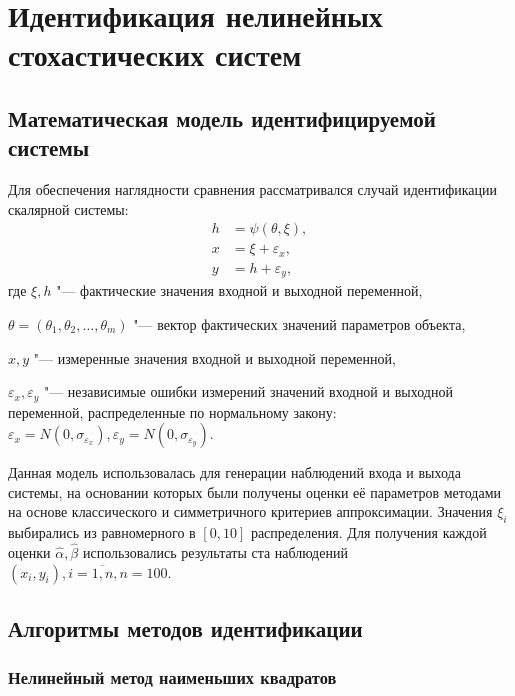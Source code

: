 \chapter[Идентификация нелинейных стохастических систем]{%
  Идентификация нелинейных \hspace{2cm}
  стохастических систем
}

\section{Математическая модель идентифицируемой системы}

Для обеспечения наглядности сравнения рассматривался случай идентификации скалярной системы:
\begin{equation}
  \label{eq:model_nonlinear_scalar}
  \begin{aligned}
  h &= \psi(\theta, \xi), \\
  x &= \xi + \varepsilon_x, \\
  y &= h + \varepsilon_y,
  \end{aligned}
\end{equation}
где \( \xi, h \) "--- фактические значения входной и выходной переменной, \par
\( \theta = (\theta_1, \theta_2, \dotsc, \theta_m) \) "--- вектор фактических значений параметров объекта, \par
\( x, y \) "--- измеренные значения входной и выходной переменной, \par
\( \varepsilon_x, \varepsilon_y \) "--- независимые ошибки измерений значений входной и
выходной переменной, распределенные по нормальному закону:
\(
\varepsilon_x = N(0, \sigma_{\varepsilon_x}),
\varepsilon_y = N(0, \sigma_{\varepsilon_y})
\).

Данная модель использовалась для генерации наблюдений входа и выхода системы,
на основании которых были получены оценки её параметров методами на основе
классического и симметричного критериев аппроксимации.
Значения \( \xi_i \) выбирались из равномерного в \( [0, 10] \) распределения.
Для получения каждой оценки \( \hat{\alpha}, \hat{\beta} \) использовались результаты
ста наблюдений \( ( x_i, y_i ), i = \overline{1, n}, n = 100 \).

\section{Алгоритмы методов идентификации}

\subsection{Нелинейный метод наименьших квадратов}

